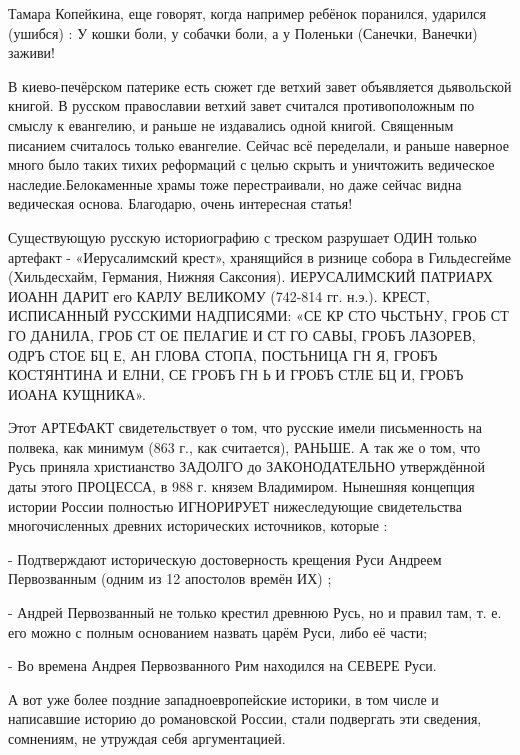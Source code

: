 \begin{itemize}
Тамара Копейкина, еще говорят, когда например ребёнок поранился, ударился
(ушибся) : У кошки боли, у собачки боли, а у Поленьки (Санечки, Ванечки)
заживи!


В киево-печёрском патерике есть сюжет где ветхий завет объявляется дьявольской
книгой. В русском православии ветхий завет считался противоположным по смыслу к
евангелию, и раньше не издавались одной книгой. Священным писанием считалось
только евангелие. Сейчас всё переделали, и раньше наверное много было таких
тихих реформаций с целью скрыть и уничтожить ведическое наследие.Белокаменные
храмы тоже перестраивали, но даже сейчас видна ведическая основа. Благодарю,
очень интересная статья!


Существующую русскую историографию с треском разрушает ОДИН только артефакт -
«Иерусалимский крест», хранящийся в ризнице собора в Гильдесгейме (Хильдесхайм,
Германия, Нижняя Саксония). ИЕРУСАЛИМСКИЙ ПАТРИАРХ ИОАНН ДАРИТ его КАРЛУ
ВЕЛИКОМУ (742-814 гг. н.э.). КРЕСТ, ИСПИСАННЫЙ РУССКИМИ НАДПИСЯМИ: «СЕ КР СТО
ЧЬСТЬНУ, ГРОБ СТ ГО ДАНИЛА, ГРОБ СТ ОЕ ПЕЛАГИЕ И СТ ГО САВЫ, ГРОБЪ ЛАЗОРЕВ,
ОДРЪ СТОЕ БЦ Е, АН ГЛОВА СТОПА, ПОСТЬНИЦА ГН Я, ГРОБЪ КОСТЯНТИНА И ЕЛНИ, СЕ
ГРОБЪ ГН Ь И ГРОБЪ СТЛЕ БЦ И, ГРОБЪ ИОАНА КУЩНИКА».

Этот АРТЕФАКТ свидетельствует о том, что русские имели письменность на полвека,
как минимум (863 г., как считается), РАНЬШЕ. А так же о том, что Русь приняла
христианство ЗАДОЛГО до ЗАКОНОДАТЕЛЬНО утверждённой даты этого ПРОЦЕССА, в 988
г. князем Владимиром. Нынешняя концепция истории России полностью ИГНОРИРУЕТ
нижеследующие свидетельства многочисленных древних исторических источников,
которые :

- Подтверждают историческую достоверность крещения Руси Андреем Первозванным
(одним из 12 апостолов времён ИХ) ;

- Андрей Первозванный не только крестил древнюю Русь, но и правил там, т. е.
его можно с полным основанием назвать царём Руси, либо её части;

- Во времена Андрея Первозванного Рим находился на СЕВЕРЕ Руси.

А вот уже более поздние западноевропейские историки, в том числе и написавшие
историю до романовской России, стали подвергать эти сведения, сомнениям, не
утруждая себя аргументацией.


\end{itemize}

